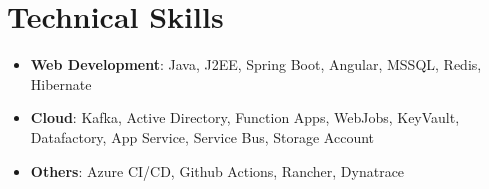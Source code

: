 \section{\textbf{Technical Skills}}
\begin{itemize}
	\small
	\setlength{\itemsep}{0pt}
	\setlength{\parskip}{0pt}
	\setlength{\parsep}{0pt}
	\item \textbf{Web Development}: Java, J2EE, Spring Boot, Angular, MSSQL, Redis, Hibernate
	\item \textbf{Cloud}: Kafka, Active Directory, Function Apps, WebJobs, KeyVault, Datafactory, App Service, Service Bus, Storage Account
	\item \textbf{Others}: Azure CI/CD, Github Actions, Rancher, Dynatrace
\end{itemize}